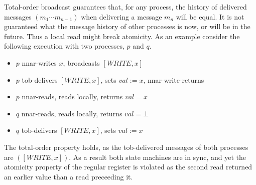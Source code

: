 \documentclass{article}
\begin{document}


    Total-order broadcast guarantees that, for any process, the history of
    delivered messages $(m_1 \cdots m_{n-1})$ when delivering a message $m_n$ will
    be equal. It is not guaranteed what the message history of
    other processes is now, or will be in the future.
    Thus a local read might break
    atomicity. As an example consider the following execution with two processes,
    $p$ and $q$.

    \begin{itemize}
        \item $p$ nnar-writes $x$, broadcasts $[WRITE, x]$
        \item $p$ tob-delivers $[WRITE, x]$, sets $val := x$, nnar-write-returns
        \item $p$ nnar-reads, reads locally, returns $val = x$
        \item $q$ nnar-reads, reads locally, returns $val = \bot$
        \item $q$ tob-delivers  $[WRITE, x]$, sets $val := x$
    \end{itemize}

    The total-order property holds, as the tob-delivered messages of both processes
    are $([WRITE, x])$. As a result both state machines are in sync, and yet the
    atomicity property of the regular register is violated as the second read
    returned an earlier value than a read preceeding it.
\end{document}
